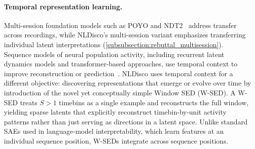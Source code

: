\paragraph{Temporal representation learning.}
Multi-session foundation models such as POYO and NDT2~\citep{azabou_2023_unified, ye_2023_ndt2} address transfer across recordings, while NLDisco's multi-session variant emphasizes transferring individual latent interpretations (\hyperref[subsubsection:rebuttal_multisession]{\ref*{subsubsection:rebuttal_multisession}}). Sequence models of neural population activity, including recurrent latent dynamics models and transformer-based approaches, use temporal context to improve reconstruction or prediction~\citep{sussillo_2013_rnn_dynamics, le_2022_stndt, ye_2023_ndt2, zhang_2024_mtm}. NLDisco uses temporal context for a different objective: discovering representations that emerge or evolve over time by introduction of the novel yet conceptually simple Window SED (W-SED). A W-SED treats $S > 1$ timebins as a single example and reconstructs the full window, yielding sparse latents that explicitly reconstruct timebin-by-unit activity patterns rather than just serving as directions in a latent space. Unlike standard SAEs used in language-model interpretability, which learn features at an individual sequence position, W-SEDs integrate across sequence positions.
